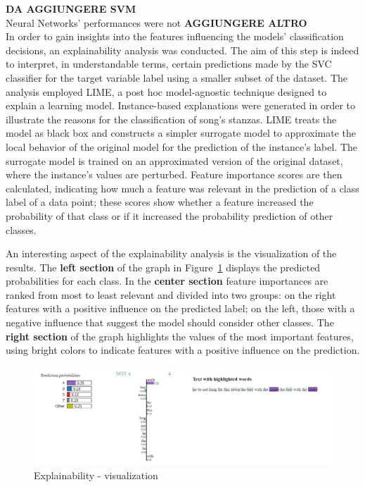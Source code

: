 \textbf{DA AGGIUNGERE SVM}\\

Neural Networks' performances were not \textbf{AGGIUNGERE ALTRO}\\

In order to gain insights into the features influencing the models' classification decisions, an explainability analysis was conducted.
The aim of this step is indeed to interpret, in understandable terms, certain predictions made by the SVC classifier for the target variable label using a smaller subset of the dataset. 
The analysis employed LIME, a post hoc model-agnostic technique designed to explain a learning model. Instance-based explanations were generated in order to illustrate the reasons for the classification of song's stanzas.
LIME treats the model as black box and constructs a simpler surrogate model to approximate the local behavior of the original model for the prediction of the instance's label. 
The surrogate model is trained on an approximated version of the original dataset, where the instance's values are perturbed. Feature importance scores are then calculated, 
indicating how much a feature was relevant in the prediction of a class label of a data point; these scores show whether a feature increased the probability of that class or if it increased the probability prediction of other classes.

An interesting aspect of the explainability analysis is the visualization of the results.
The \textbf{left section} of the graph in Figure~\ref{fig:expl} displays the predicted probabilities for each class. In the \textbf{center section}
feature importances are ranked from most to least relevant and divided into two groups: on the right
features with a positive influence on the predicted label; on the left, those with a negative influence that suggest the model should consider other classes.
The \textbf{right section} of the graph highlights the values of the most important
features, using bright colors to indicate features with a positive influence on the prediction.

\begin{figure}[H]
    \centering
    \includegraphics[scale= 0.55]{pictures/expl.png}
    \caption{Explainability - visualization}
    \label{fig:expl}
\end{figure}

